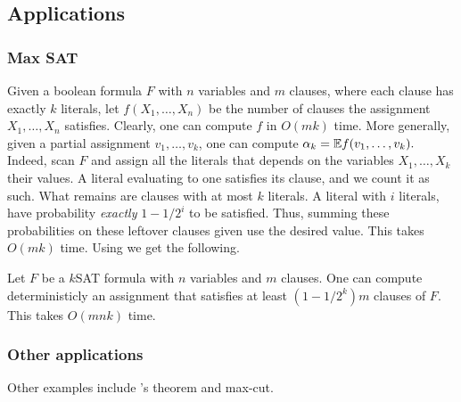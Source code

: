 \subsection{Applications}
\subsubsection{Max SAT}

Given a boolean formula $F$ with $n$ variables and $m$ clauses, where each
clause has exactly $k$ literals, let $f(X_1, \ldots,X_n)$ be the
number of clauses the assignment $X_1, \ldots, X_n$
satisfies. Clearly, one can compute $f$ in $O(m k )$ time. More
generally, given a partial assignment $v_1, \ldots, v_k$, one can
compute
\begin{math}
    \alpha_k = \mathbb{E} f(v_1, \ldots, v_k).
\end{math}
Indeed, scan $F$ and assign all the literals that depends on the
variables $X_1, \ldots, X_k$ their values. A literal evaluating to one
satisfies its clause, and we count it as such. What remains are
clauses with at most $k$ literals. A literal with $i$ literals, have
probability \emph{exactly} $1-1/2^i$ to be satisfied. Thus, summing
these probabilities on these leftover clauses given use the desired
value. This takes $O(mk )$ time. 
Using     we get the following.

\begin{lemma}
    Let $F$ be a $k$SAT formula with $n$ variables and $m$
    clauses. One can compute deterministicly an assignment that
    satisfies at least $(1-1/2^{k})m$ clauses of $F$. This takes
    $O( mnk)$ time.
\end{lemma}

\subsubsection{Other applications}

Other examples include \Turan's theorem and max-cut.


\nocite{mr-ra-95}

\ChapterEnd{}

